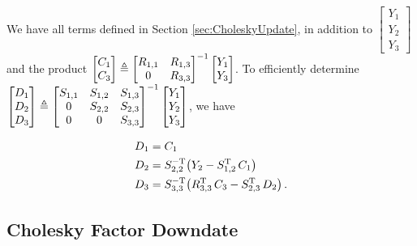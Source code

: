 \documentclass{acmtrans2m}
\begin{document}
\noindent We have all terms defined in Section \ref{sec:CholeskyUpdate}, in addition to $\begin{bmatrix} Y_1\\Y_2\\Y_3 \end{bmatrix}$ and the product $\begin{bmatrix} C_1\\C_3 \end{bmatrix}\triangleq\begin{bmatrix} R_{1,1} & R_{1,3} \\ 0 & R_{3,3} \end{bmatrix}^{-1} \begin{bmatrix} Y_1\\Y_3 \end{bmatrix}$. To efficiently determine $\begin{bmatrix} D_1\\D_2\\D_3 \end{bmatrix}\triangleq\begin{bmatrix} S_{1,1} & S_{1,2} & S_{1,3} \\ 0 & S_{2,2} & S_{2,3} \\ 0 & 0 & S_{3,3} \end{bmatrix}^{-1} \begin{bmatrix} Y_1\\Y_2\\Y_3 \end{bmatrix}$, we have

\begin{align}
 D_{1}&=C_{1}\\
D_{2} &=S_{2,2}^{-\mathrm{T}}\big(Y_2-S_{1,2}^{\mathrm{T}}\,C_1\big)\\
D_{3}&=S_{3,3}^{-\mathrm{T}}\big(R_{3,3}^{\mathrm{T}} \, C_3-S_{2,3}^{\mathrm{T}}\,D_2\big)\,.
\end{align}

\subsection{Cholesky Factor Downdate} \label{sec:CholeskyDowndate}
\end{document}
